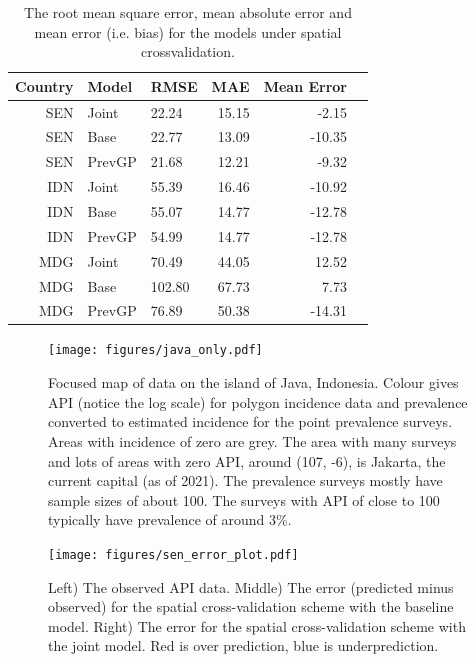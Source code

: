 \documentclass[10pt,a4]{article}
\begin{document}
\begin{table}[ht]
\centering
\begin{tabular}{rllrrr}
  \hline
  Country & Model & RMSE & MAE & Mean Error \\ 
  \hline
SEN & Joint & 22.24 & 15.15 & -2.15 \\ 
  SEN & Base & 22.77 & 13.09 & -10.35 \\ 
  SEN & PrevGP & 21.68 & 12.21 & -9.32 \\ 
  IDN & Joint & 55.39 & 16.46 & -10.92 \\ 
  IDN & Base & 55.07 & 14.77 & -12.78 \\ 
  IDN & PrevGP & 54.99 & 14.77 & -12.78 \\ 
  MDG & Joint & 70.49 & 44.05 & 12.52 \\ 
  MDG & Base & 102.80 & 67.73 & 7.73 \\ 
  MDG & PrevGP & 76.89 & 50.38 & -14.31 \\ 

   \hline
\end{tabular}
\caption{The root mean square error, mean absolute error and mean error (i.e. bias) for the models under spatial crossvalidation.}
\end{table}



\begin{figure}[h!]
\centering

\texttt{[image: figures/java\_only.pdf]}

\caption{
Focused map of data on the island of Java, Indonesia.
Colour gives API (notice the log scale) for polygon incidence data and prevalence converted to estimated incidence for the point prevalence surveys.
Areas with incidence of zero are grey.
The area with many surveys and lots of areas with zero API, around (107, -6), is Jakarta, the current capital (as of 2021).
The prevalence surveys mostly have sample sizes of about 100. 
The surveys with API of close to 100 typically have prevalence of around 3\%.
}
\label{rnd_cv_error}
\end{figure}



\begin{figure}[h!]
\centering

\texttt{[image: figures/sen\_error\_plot.pdf]}

\caption{
Left) The observed API data.
Middle) The error (predicted minus observed) for the spatial cross-validation scheme with the baseline model.
Right) The error for the spatial cross-validation scheme with the joint model.
Red is over prediction, blue is underprediction.
}
\label{rnd_cv_error}
\end{figure}
\end{document}
